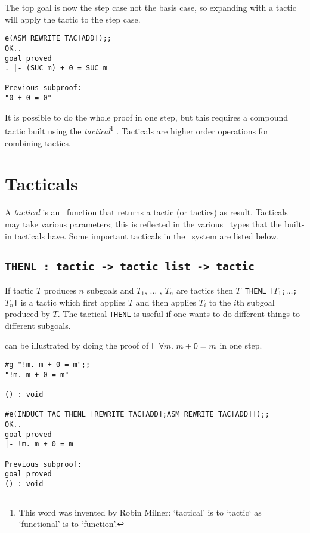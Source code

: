 \noindent The top goal is now the step case not the basis case, so expanding
with a tactic will apply the tactic to the step case.

\begin{session}\begin{verbatim}
e(ASM_REWRITE_TAC[ADD]);;
OK..
goal proved
. |- (SUC m) + 0 = SUC m

Previous subproof:
"0 + 0 = 0"
\end{verbatim}\end{session}

It is possible to do the whole proof in one step, but this requires a compound
tactic built using the {\it tactical\/}\footnote{This word was invented by Robin
Milner: `tactical' is to `tactic` as `functional' is to `function'.} .
Tacticals are higher order operations for combining tactics.

\section{Tacticals}
\label{tacticals}

A {\it tactical\/}
is an \ML\ function that returns a tactic (or tactics) as result.
Tacticals may take various parameters; this is reflected in the various
\ML\ types that the built-in tacticals have. Some important tacticals in
the \HOL\ system
are listed below.


\subsection{\tt THENL : tactic -> tactic list -> tactic}

If tactic $T$ produces $n$ subgoals and $T_1$, $\ldots$ ,
$T_n$ are tactics
then $T${\small\verb| THENL|} {\small\verb|[|}$T_1${\small\verb|;|}$\ldots${\small\verb|;|}$T_n${\small\verb|]|}
is a tactic which first applies $T$ and then
applies $T_i$ to the $i$th subgoal produced by $T$.
The tactical {\small\verb|THENL|} is useful if one wants to do different
things to different subgoals.

 can be illustrated by doing the proof of $\vdash \forall m.\ m+0=m$ in
one step.

\setcounter{sessioncount}{1}
\begin{session}\begin{verbatim}
#g "!m. m + 0 = m";;
"!m. m + 0 = m"

() : void

#e(INDUCT_TAC THENL [REWRITE_TAC[ADD];ASM_REWRITE_TAC[ADD]]);;
OK..
goal proved
|- !m. m + 0 = m

Previous subproof:
goal proved
() : void
\end{verbatim}\end{session}

